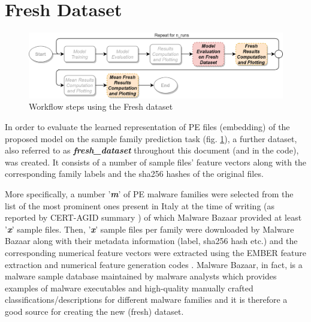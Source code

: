 \documentclass[pdfa%
,cucitura%
]{toptesi}
\begin{document}
\section{Fresh Dataset}
\begin{figure}[h!]
	\centering
	\includegraphics[width=\textwidth]{./images/workflow_fresh_dataset.png}
	\caption[Fresh dataset workflow steps]{Workflow steps using the Fresh dataset}
	\label{fig:workflow_fresh_dataset}
\end{figure}

In order to evaluate the learned representation of PE files (embedding) of the proposed model on the sample family prediction task (fig. \ref{fig:workflow_fresh_dataset}), a further dataset, also referred to as \textit{\textbf{fresh\_dataset}} throughout this document (and in the code), was created. It consists of a number of sample files' feature vectors along with the corresponding family labels and the sha256 hashes of the original files.

More specifically, a number '\textit{\textbf{m}}' of PE malware families were selected from the list of the most prominent ones present in Italy at the time of writing (as reported by CERT-AGID summary \cite{CERTAGID}) of which Malware Bazaar provided at least '\textit{\textbf{x}}' sample files. Then, '\textit{\textbf{x}}' sample files per family were downloaded by Malware Bazaar \cite{MalwareBazaar} along with their metadata information (label, sha256 hash etc.) and the corresponding numerical feature vectors were extracted using the EMBER feature extraction and numerical feature generation codes \cite{AndersonEMBER}. Malware Bazaar, in fact, is a malware sample database maintained by malware analysts which provides examples of malware executables and high-quality manually crafted classifications/descriptions for different malware families and it is therefore a good source for creating the new (fresh) dataset.
\end{document}
